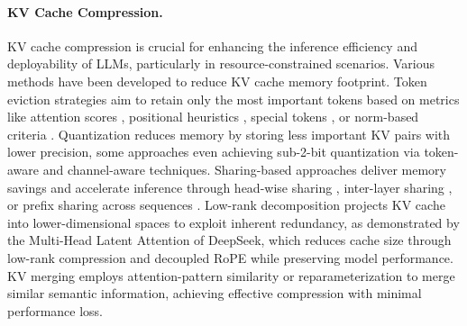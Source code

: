 \paragraph{KV Cache Compression.} KV cache compression is crucial for enhancing the inference efficiency and deployability of LLMs, particularly in resource-constrained scenarios. Various methods have been developed to reduce KV cache memory footprint. Token eviction strategies aim to retain only the most important tokens based on metrics like attention scores \citep{snapkv,h2o}, positional heuristics \citep{streamingllm}, special tokens \citep{gemodel,sepllm}, or norm-based criteria \citep{simple}. Quantization \citep{kivi,kvquant} reduces memory by storing less important KV pairs with lower precision, some approaches even achieving sub-2-bit quantization via token-aware and channel-aware techniques. Sharing-based approaches deliver memory savings and accelerate inference through head-wise sharing \citep{mqa,gqa}, inter-layer sharing \citep{sun2024you,wu2024layer,brandon2024reducing}, or prefix sharing across sequences \citep{hydragen,relayattention}. Low-rank decomposition \citep{gear,palu} projects KV cache into lower-dimensional spaces to exploit inherent redundancy, as demonstrated by the Multi-Head Latent Attention \citep{deepseekv3} of DeepSeek, which reduces cache size through low-rank compression and decoupled RoPE while preserving model performance. KV merging \citep{keepkv,homogeneous} employs attention-pattern similarity or reparameterization to merge similar semantic information, achieving effective compression with minimal performance loss.





